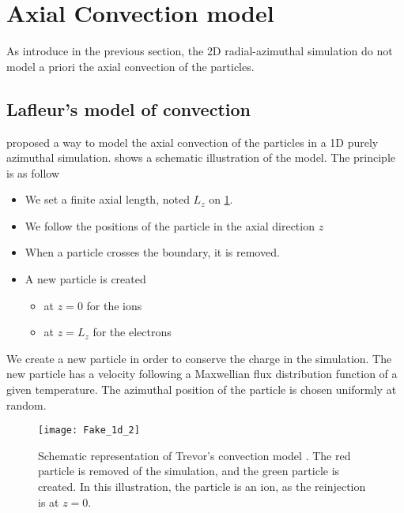 
\section{Axial Convection model}
  \label{sec-reinjectionnoise}

  As introduce in the previous section, the \ac{2D} radial-azimuthal simulation do not model a priori the axial convection of the particles.

  \subsection{Lafleur's model of convection}

    \citet{lafleur2016a} proposed a way to model the axial convection of the particles in a \ac{1D} purely azimuthal simulation.
     shows a schematic illustration of the model.
    The principle is as follow
    \begin{itemize}
      \item We set a finite axial length, noted $L_z$ on \cref{fig-Fake_1d_1}.
      \item We follow the positions of the particle in the axial direction $z$
      \item When a particle crosses the boundary, it is removed.
      \item A new particle is created
      \begin{itemize}
        \item at $z=0$ for the ions
        \item  at $z=L_z$ for the electrons
      \end{itemize}
    \end{itemize}

    We create a new particle in order to conserve the charge in the simulation.
    The new particle has a velocity following a Maxwellian flux distribution function of a given temperature.
    The azimuthal position of the particle is chosen uniformly at random.


    \begin{figure}[hbtp]
      \centering
      \texttt{[image: Fake\_1d\_2]}
      \caption{Schematic representation of Trevor's convection model \citep{lafleur2016a}. The red particle is removed of the simulation, and the green particle is created. In this illustration, the particle is an ion, as the reinjection is at $z=0$. }
      \label{fig-Fake_1d_1}
    \end{figure}

